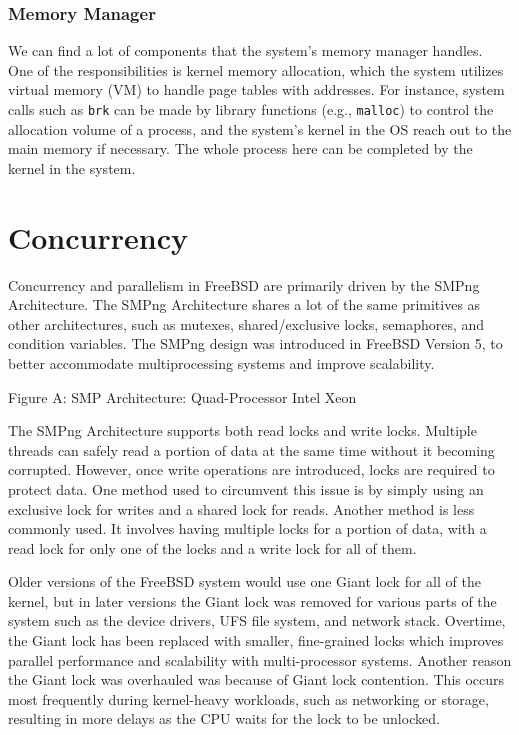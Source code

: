 \documentclass[12pt, dvipsnames, a4paper]{article}
\newcommand{\code}[1]{\texttt{#1}}
\begin{document}
\subsubsection{Memory Manager}
We can find a lot of components that the system’s memory manager handles. One of the responsibilities is kernel memory allocation, which the system utilizes virtual memory (VM) to handle page tables with addresses. For instance, system calls such as \code{brk} can be made by library functions (e.g., \code{malloc}) to control the allocation volume of a process, and the system’s kernel in the OS reach out to the main memory if necessary. The whole process here can be completed by the kernel in the system.\par

\section{Concurrency}
Concurrency and parallelism in FreeBSD are primarily driven by the SMPng Architecture. The SMPng Architecture shares a lot of the same primitives as other architectures, such as mutexes, shared/exclusive locks, semaphores, and condition variables. The SMPng design was introduced in FreeBSD Version 5, to better accommodate multiprocessing systems and improve scalability.


Figure A: SMP Architecture: Quad-Processor Intel Xeon

The SMPng Architecture supports both read locks and write locks. Multiple threads can safely read a portion of data at the same time without it becoming corrupted. However, once write operations are introduced, locks are required to protect data. One method used to circumvent this issue is by simply using an exclusive lock for writes and a shared lock for reads. Another method is less commonly used. It involves having multiple locks for a portion of data, with a read lock for only one of the locks and a write lock for all of them.

Older versions of the FreeBSD system would use one Giant lock for all of the kernel, but in later versions the Giant lock was removed for various parts of the system such as the device drivers, UFS file system, and network stack. Overtime, the Giant lock has been replaced with smaller, fine-grained locks which improves parallel performance and scalability with multi-processor systems. Another reason the Giant lock was overhauled was because of Giant lock contention. This occurs most frequently during kernel-heavy workloads, such as networking or storage, resulting in more delays as the CPU waits for the lock to be unlocked.
\end{document}
